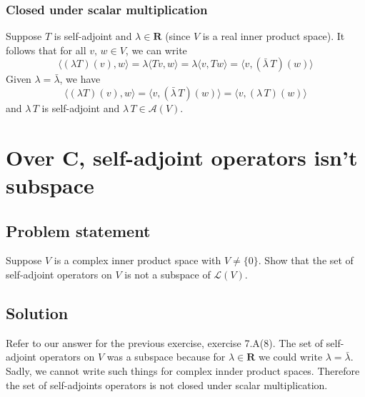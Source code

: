 \documentclass{article}
\begin{document}
\subsubsection*{Closed under scalar multiplication}
Suppose $T$ is self-adjoint and $\lambda\in\mathbf{R}$ (since $V$ is a real inner product space). It follows that for all $v,\,w\in V$, we can write
\[\langle (\lambda T)(v),w\rangle=\lambda\langle Tv,w\rangle=\lambda\langle v,Tw\rangle=\langle v,(\bar{\lambda}\,T)(w)\rangle\]
Given $\lambda=\bar{\lambda}$, we have
\[\langle (\lambda T)(v),w\rangle=\langle v,(\bar{\lambda}\,T)(w)\rangle=\langle v,(\lambda\,T)(w)\rangle\]
and $\lambda\,T$ is self-adjoint and $\lambda\,T\in\mathcal{A}(V)$.

\clearpage

\renewcommand{\thesection}{9}
\section{Over $\mathbf{C}$, self-adjoint operators isn't subspace}
\subsection*{Problem statement}
Suppose $V$ is a complex inner product space with $V\neq\{0\}$. Show that the set of self-adjoint operators on $V$ is not a subspace of $\mathcal{L}(V)$.

\subsection*{Solution}
Refer to our answer for the previous exercise, exercise 7.A(8). The set of self-adjoint operators on $V$ was a subspace because for $\lambda\in\mathbf{R}$ we could write $\lambda=\bar{\lambda}$. Sadly, we cannot write such things for complex innder product spaces. Therefore the set of self-adjoints operators is not closed under scalar multiplication.
\end{document}
